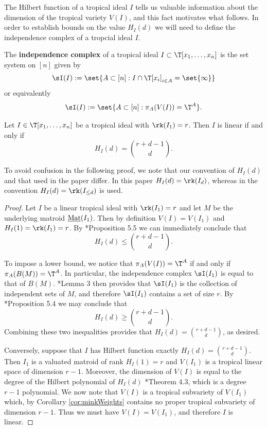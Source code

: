     The Hilbert function of a tropical ideal $I$ tells us valuable information about the dimension of the tropical variety $V(I)$, and this fact motivates what follows. In order to establish bounds on the value $H_I(d)$ we will need to define the independence complex of a tropcial ideal $I$.
\begin{definition}\label{def:independenceComplex}
    The \textbf{independence complex} of a tropical ideal $I\subset\T[x_1,\dots,x_n]$ is the set system on $[n]$ given by
    $$\sI(I):= \set{A\subset [n]: I\cap \T[x_i]_{i\in A} = \set{\infty}}$$
    or equivalently
    $$\sI(I):= \set{A\subset [n]: \pi_{A}(V(I))=\T^{A} }.$$
\end{definition}

    
\begin{proposition}\label{prop:linearHFequiv}
    Let $I\in \T[x_1,\dots,x_n]$ be a tropical ideal with $\rk(I_1)=r$. Then $I$ is linear if and only if
    $$H_I(d)=\binom{r+d-1}{d}.$$
\end{proposition}
To avoid confusion in the following proof, we note that our convention of $H_I(d)$ and that used in the paper \cite{DR19} differ. In this paper $H_I(d)=\rk(I_d)$, whereas in \cite{DR19} the convention $H_I(d)=\rk(I_{\leq d})$ is used.
\begin{proof}
Let $I$ be a linear tropical ideal with $\rk(I_1)=r$ and let $M$ be the underlying matroid $\operatorname{\underline{Mat}}(I_1)$. Then by definition $V(I)=V(I_1)$ and $H_I(1)=\rk(I_1)=r$. By \cite{DR19}*{Proposition 5.5} we can immediately conclude that
$$H_I(d)\leq \binom{r+d-1}{d}.$$

To impose a lower bound, we notice that $\pi_A(V(I))=\T^A$ if and only if $\pi_A(B(M))=\T^A$. In particular, the independence complex $\sI(I_1)$ is equal to that of $B(M)$. \cite{Yu17}*{Lemma 3} then provides that $\sI(I_1)$ is the collection of independent sets of $M$, and therefore $\sI(I_1)$ contains a set of size $r$. By \cite{DR19}*{Proposition 5.4} we may conclude that
$$H_I(d)\geq \binom{r+d-1}{d}.$$ 
Combining these two inequalities provides that $H_I(d)= \binom{r+d-1}{d}$, as desired.

Conversely, suppose that $I$ has Hilbert function exactly $H_I(d)=\binom{r+d-1}{d}$. Then $I_1$ is a valuated matroid of rank $H_I(1)=r$ and $V(I_1)$ is a tropical linear space of dimension $r-1$. Moreover, the dimension of $V(I)$ is equal to the degree of the Hilbert polynomial of $H_I(d)$ \cite{MR20}*{Theorem 4.3}, which is a degree $r-1$ polynomial. We now note that $V(I)$ is a tropical subvariety of $V(I_1)$ which, by Corollary \ref{cor:minkWeights} contains no proper tropical subvariety of dimension $r-1$. Thus we must have $V(I)=V(I_1)$, and therefore $I$ is linear.
\end{proof}

